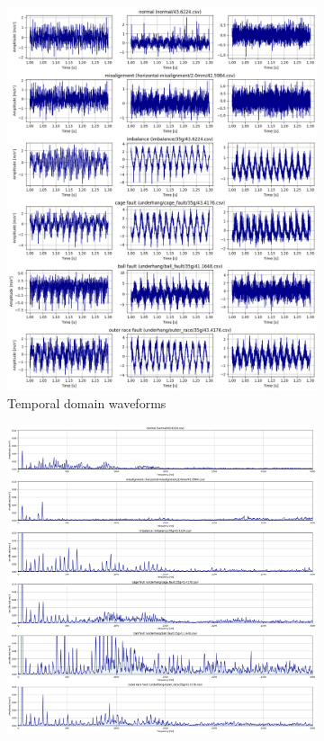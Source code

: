 \begin{figure}[ht]
    \centering
    \begin{subfigure}[b]{0.44\textwidth}
        \includegraphics[width=\textwidth]{assets/design/Mafaulda-A-time-waveform.png}
        \caption{Temporal domain waveforms}
        \label{fig:design:fault-temporal-waveform}
    \end{subfigure}
    \hfill
    \begin{subfigure}[b]{0.55\textwidth}
        \includegraphics[width=\textwidth]{assets/design/Mafaulda-A-spectrum-Y-axis.png}

\end{subfigure}
\end{figure}
